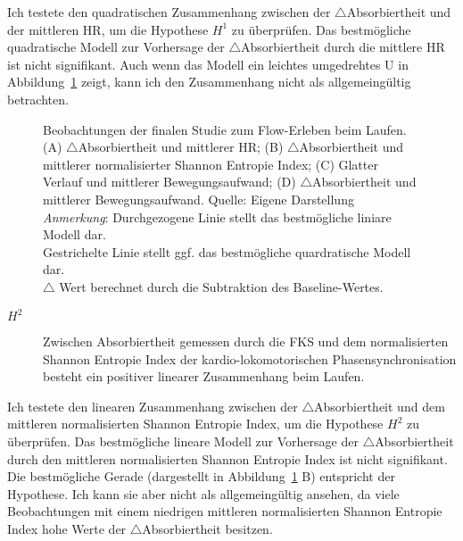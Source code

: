 Ich testete den quadratischen Zusammenhang zwischen der $\bigtriangleup$Absorbiertheit und der mittleren \ac{HR}, um die Hypothese $H^1$ zu überprüfen. Das bestmögliche quadratische Modell zur Vorhersage der $\bigtriangleup$Absorbiertheit durch die mittlere \ac{HR} ist nicht signifikant. Auch wenn das Modell ein leichtes umgedrehtes U in Abbildung~\ref{fig:5_18_regression} zeigt, kann ich den Zusammenhang nicht als allgemeingültig betrachten.

\begin{figure}
	
	\caption[Beobachtungen der finalen Studie zum Flow-Erleben beim Laufen]{Beobachtungen der finalen Studie zum Flow-Erleben beim Laufen. (A) $\bigtriangleup$Absorbiertheit und mittlerer HR; (B) $\bigtriangleup$Absorbiertheit und mittlerer normalisierter Shannon Entropie Index; (C) Glatter Verlauf und mittlerer Bewegungsaufwand; (D) $\bigtriangleup$Absorbiertheit und mittlerer Bewegungsaufwand. Quelle: Eigene Darstellung \\ \hspace{\textwidth}\emph{Anmerkung}: Durchgezogene Linie stellt das bestmögliche liniare Modell dar. \\ \hspace{\textwidth}Gestrichelte Linie stellt ggf. das bestmögliche quardratische Modell dar. \\ \hspace{\textwidth}$\bigtriangleup$ Wert berechnet durch die Subtraktion des Baseline-Wertes.}
	\label{fig:5_18_regression}
\end{figure}

\begin{description}
	\item[$H^2$] Zwischen Absorbiertheit gemessen durch die \ac{FKS} und dem normalisierten Shannon Entropie Index der kardio-lokomotorischen Phasensynchronisation besteht ein positiver linearer Zusammenhang beim Laufen.
\end{description}

Ich testete den linearen Zusammenhang zwischen der $\bigtriangleup$Absorbiertheit
und dem mittleren normalisierten Shannon Entropie Index, um die Hypothese $H^2$ zu überprüfen. Das bestmögliche lineare Modell zur Vorhersage der $\bigtriangleup$Absorbiertheit durch den mittleren normalisierten Shannon Entropie Index ist nicht signifikant. Die bestmögliche Gerade (dargestellt in Abbildung~\ref{fig:5_18_regression} B) entspricht der Hypothese. Ich kann sie aber nicht als allgemeingültig ansehen, da viele Beobachtungen mit einem niedrigen mittleren normalisierten Shannon Entropie Index hohe Werte der $\bigtriangleup$Absorbiertheit besitzen.

